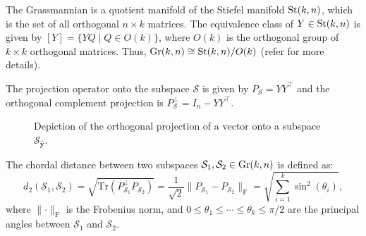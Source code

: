 The Grassmannian is a quotient manifold of the Stiefel manifold $\text{St}(k,n)$, which is the set of all orthogonal $n \times k$ matrices. The equivalence class of $Y \in \text{St}(k,n)$ is given by $[Y] = \{ Y Q \mid Q \in O(k) \}$, where $O(k)$ is the orthogonal group of $k \times k$ orthogonal matrices. Thus, $\text{Gr}(k,n) \cong \text{St}(k,n) / O(k)$ (refer \cite{boumal2023} for more details).

The projection operator onto the subspace $\mathcal{S}$ is given by $P_{\mathcal{S}} = Y Y^\top$ and the orthogonal complement projection is $P_{\mathcal{S}}^{\perp} = I_n - Y Y^\top$.

\begin{figure}[h]
    \centering
{}
\caption{Depiction of the orthogonal projection of a vector onto a subspace $\mathcal{S}_{\hat{\mathbf{y}}}$.}
\end{figure}

\begin{definition}\label{defn:chordal}
    The chordal distance between two subspaces $\mathcal{S}_1, \mathcal{S}_2 \in \text{Gr}(k,n)$ is defined as:
    \[
        d_{2}(\mathcal{S}_1, \mathcal{S}_2) = \sqrt{\mathrm{Tr}\left(P_{\mathcal{S}_1}^\perp P_{\mathcal{S}_2}\right)} = \frac{1}{\sqrt{2}}\lVert P_{\mathcal{S}_1} - P_{\mathcal{S}_2} \rVert_{\mathrm{F}} = \sqrt{\sum_{i=1}^{k} \sin^2(\theta_i)},
    \]
    where $\lVert \cdot \rVert_{\mathrm{F}}$ is the Frobenius norm, and $0 \leq \theta_1 \leq \cdots \leq \theta_k \leq \pi/2$ are the principal angles between $\mathcal{S}_1$ and $\mathcal{S}_2$.
    
\end{definition}

